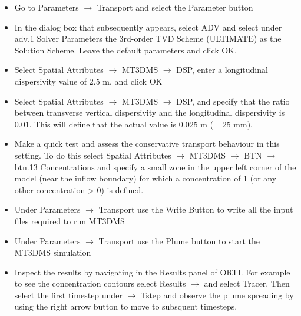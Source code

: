 \begin{itemize}

\item Go to {\color{blue}Parameters} $\rightarrow$ {\color{blue}Transport} and select the {\color{blue}Parameter} button

\item In the dialog box that subsequently appears, select {\color{blue}ADV} and select under {\color{blue}adv.1 Solver Parameters} the {\color{blue}3rd-order TVD Scheme (ULTIMATE)} as the Solution Scheme. Leave the default parameters and click {\color{blue}OK}.

\item Select {\color{blue}Spatial Attributes} $\rightarrow$ {\color{blue}MT3DMS} $\rightarrow$ {\color{blue}DSP}, enter a longitudinal dispersivity value of 2.5 m. and click {\color{blue}OK}

\item Select {\color{blue}Spatial Attributes} $\rightarrow$ {\color{blue}MT3DMS} $\rightarrow$ {\color{blue}DSP}, and specify that the ratio between transverse vertical dispersivity and the longitudinal dispersivity is 0.01.
This will define that the actual value is 0.025 m (= 25 mm). 

\item Make a quick test and assess the conservative transport behaviour in this setting.
To do this select {\color{blue}Spatial Attributes} $\rightarrow$ {\color{blue}MT3DMS} $\rightarrow$ {\color{blue}BTN} $\rightarrow$ {\color{blue}btn.13 Concentrations} and specify 
a small zone in the upper left corner of the model (near the inflow boundary) 
for which a concentration of 1 (or any other concentration > 0) is defined.

\item Under {\color{blue}Parameters} $\rightarrow$ {\color{blue}Transport} use the {\color{blue}Write Button} to write all the input files required to run MT3DMS

\item Under {\color{blue}Parameters} $\rightarrow$ {\color{blue}Transport} use the 
{\color{blue}Plume} button to start the MT3DMS simulation

\item Inspect the results by navigating in the {\color{blue} Results} panel of ORTI.
For example to see the concentration contours select {\color{blue}Results} $\rightarrow$ 
and select {\color{blue}Tracer}. Then select the first timestep 
under $\rightarrow$ {\color{blue}Tstep} and observe the plume spreading by using the 
right arrow button to move to subsquent timesteps.  

\end{itemize}

